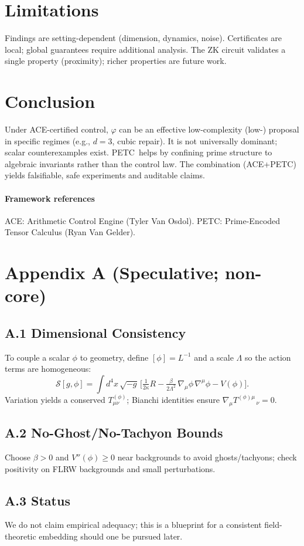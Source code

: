\documentclass[11pt]{article}
\newcommand{\1}{\mathbf{1}}
\newcommand{\phival}{\varphi} %
\newcommand{\ACE}{\textsc{ACE}}
\newcommand{\PETC}{\textsc{PETC}}
\newcommand{\mdl}{\mathrm{MDL}}
\begin{document}
\section{Limitations}
Findings are setting-dependent (dimension, dynamics, noise). Certificates are local; global guarantees require additional analysis. The ZK circuit validates a single property (proximity); richer properties are future work.

\section{Conclusion}
Under \ACE-certified control, $\phival$ can be an effective low-complexity (low-\mdl) proposal in specific regimes (e.g., $d=3$, cubic repair). It is not universally dominant; scalar counterexamples exist. \PETC\ helps by confining prime structure to algebraic invariants rather than the control law. The combination (\ACE+\PETC) yields falsifiable, safe experiments and auditable claims.

\paragraph{Framework references} \ACE: Arithmetic Control Engine (Tyler Van Osdol). \PETC: Prime-Encoded Tensor Calculus (Ryan Van Gelder).

\appendix
\section*{Appendix A (Speculative; non-core)}
\subsection*{A.1 Dimensional Consistency}
To couple a scalar $\phi$ to geometry, define $[\phi]=L^{-1}$ and a scale $\Lambda$ so the action terms are homogeneous:
\begin{equation}
\mathcal{S}[g,\phi]=\int d^4x\,\sqrt{-g}\,\Big[\tfrac{1}{2\kappa}R-\tfrac{\beta}{2\Lambda^2}\,\nabla_\mu\phi\,\nabla^\mu\phi - V(\phi)\Big].
\end{equation}
Variation yields a conserved $T_{\mu\nu}^{(\phi)}$; Bianchi identities ensure $\nabla_\mu T^{(\phi)\mu}{}_{\,\nu}=0$.

\subsection*{A.2 No-Ghost/No-Tachyon Bounds}
Choose $\beta>0$ and $V''(\phi)\ge0$ near backgrounds to avoid ghosts/tachyons; check positivity on FLRW backgrounds and small perturbations.

\subsection*{A.3 Status}
We do not claim empirical adequacy; this is a blueprint for a consistent field-theoretic embedding should one be pursued later.
\nocite{*}


\end{document}
